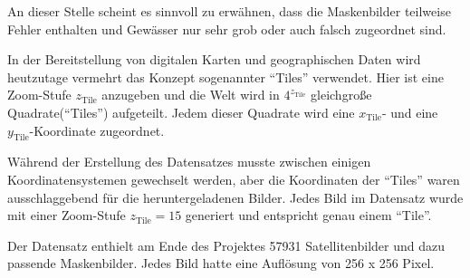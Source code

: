 An dieser Stelle scheint es sinnvoll zu erwähnen, dass die Maskenbilder teilweise Fehler enthalten und Gewässer nur sehr grob oder auch falsch zugeordnet sind. 

In der Bereitstellung von digitalen Karten und geographischen Daten wird heutzutage vermehrt das Konzept sogenannter \enquote{Tiles} verwendet.\cite{tiles}
Hier ist eine Zoom-Stufe $z_\text{Tile}$ anzugeben und die Welt wird in $4^{z_\text{Tile}}$ gleichgroße Quadrate(\enquote{Tiles}) aufgeteilt.
Jedem dieser Quadrate wird eine $x_\text{Tile}$- und eine $y_\text{Tile}$-Koordinate zugeordnet.

Während der Erstellung des Datensatzes musste zwischen einigen Koordinatensystemen gewechselt werden, aber die Koordinaten der \enquote{Tiles} waren ausschlaggebend für die heruntergeladenen Bilder.
Jedes Bild im Datensatz wurde mit einer Zoom-Stufe $z_\text{Tile} = 15$ generiert und entspricht genau einem \enquote{Tile}.

Der Datensatz enthielt am Ende des Projektes 57931 Satellitenbilder und dazu passende Maskenbilder.
Jedes Bild hatte eine Auflösung von 256 x 256 Pixel.
